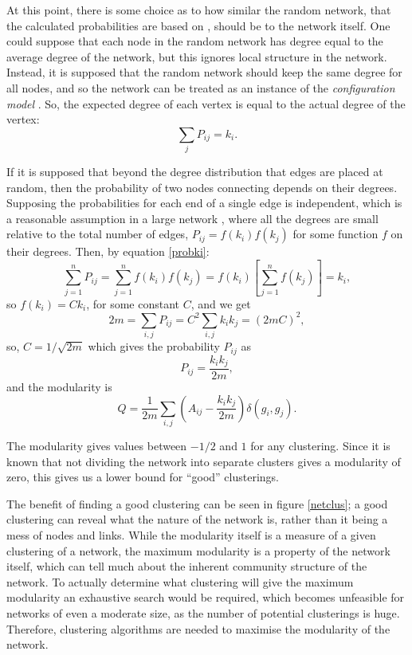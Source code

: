 At this point, there is some choice as to how similar the random network, that the calculated probabilities are based on , should be to the network itself.  One could suppose that each node 
in the random network has degree equal to the average degree of the 
network, but this ignores local structure in the network.  Instead, it is supposed that 
the random network should keep the same degree for all nodes, and so the network can be treated as an instance of the \emph{configuration model} \citep{BenderCanfield1978a, Bollobas1980a}.  So, the expected 
degree of each vertex is equal to the actual degree of the vertex:
\begin{equation}
\sum_j P_{ij} = k_i.
\label{probki}
\end{equation}

If it is supposed that beyond the degree distribution that edges are placed at random, 
then the probability of two nodes connecting depends on their 
degrees. Supposing the probabilities for each end of a single edge is independent, which is a reasonable assumption in a large network \citep{Newman2010a}, where all the degrees are small 
relative to the total number of edges, $P_{ij} = f(k_i)f(k_j)$ for 
some function $f$ on their degrees.  Then, by equation \ref{probki}:
\begin{equation}
\sum_{j=1}^{n}P_{ij} = \sum_{j=1}^n f(k_i)f(k_j) = f(k_i)\left[\sum_{j=1}^n f(k_j)\right]=k_i,
\end{equation}
so $f(k_i) = Ck_i$, for some constant $C$, and we get
\begin{equation}
2m = \sum_{i,j}P_{ij} = C^2\sum_{i,j}k_ik_j = (2mC)^2,
\end{equation}
so, $C = 1/\sqrt{2m}$ which gives the probability $P_{ij}$ as
\begin{equation}
P_{ij} = \frac{k_i k_j}{2m},
\end{equation}
and the modularity is
\begin{equation}\label{NewMod}
Q= \frac{1}{2m}\sum_{i,j} \left(A_{ij} -
\frac{k_ik_j}{2m}\right)\delta(g_i,g_j).
\end{equation}

The modularity gives values between $-1/2$ and $1$ for any clustering.  Since it is known that not 
dividing the network into separate clusters gives a modularity of zero, this 
gives us a lower bound for ``good'' clusterings.

The benefit of finding a good clustering can be seen in figure \ref{netclus}; 
a good clustering can reveal what the nature of the network is, rather than it 
being a mess of nodes and links.  While the modularity itself is a measure of a 
given clustering of a network, the maximum modularity is a property of the 
network itself, which can tell much about the inherent community structure of the 
network. To actually determine what clustering will give the maximum modularity an exhaustive search would be required, which becomes unfeasible for networks of even  a moderate size, as the number of potential clusterings is huge. Therefore, clustering algorithms are needed to 
maximise the modularity of the network.

